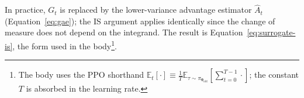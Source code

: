 In practice, $G_t$ is replaced by the lower-variance advantage estimator $\hat{A}_t$ (Equation~\ref{eq:gae}); the IS argument applies identically since the change of measure does not depend on the integrand. The result is Equation~\ref{eq:surrogate-is}, the form used in the body\footnote{The body uses the PPO shorthand $\mathbb{E}_t[\cdot] \equiv \tfrac{1}{T}\mathbb{E}_{\tau \sim \pi_{\boldsymbol{\theta}_{\text{old}}}}\!\left[\sum_{t=0}^{T-1} \cdot\right]$; the constant $T$ is absorbed in the learning rate.}.